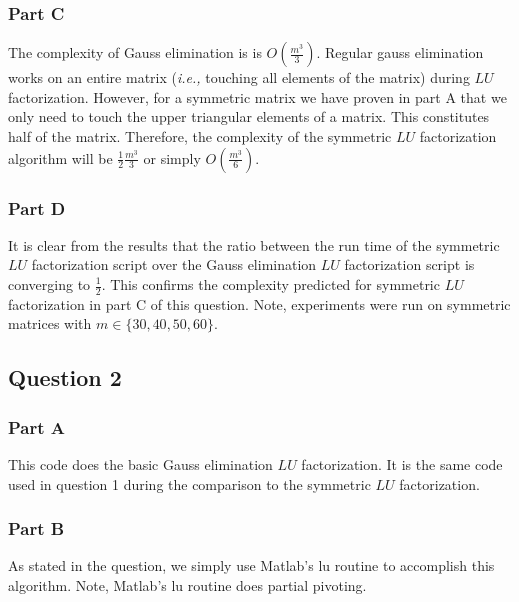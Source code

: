 

\subsubsection{Part C}
The complexity of Gauss elimination is is \(O(\frac{m^{3}}{3})\).
Regular gauss elimination works on an entire matrix ({\em i.e.,} touching all elements of the matrix) during \(LU\) factorization.
However, for a symmetric matrix we have proven in part A that we only need to touch the upper triangular elements of a matrix.
This constitutes half of the matrix.
Therefore, the complexity of the symmetric \(LU\) factorization algorithm will be \(\frac{1}{2}\frac{m^{3}}{3}\) or simply \(O(\frac{m^{3}}{6})\).

\newpage
\subsubsection{Part D}




It is clear from the results that the ratio between the run time of the symmetric \(LU\) factorization script over the Gauss elimination \(LU\) factorization script is converging to \(\frac{1}{2}\).
This confirms the complexity predicted for symmetric \(LU\) factorization in part C of this question.
Note, experiments were run on symmetric matrices with \(m \in \{30,40,50,60 \}\).

\newpage
\subsection{Question 2}

\subsubsection{Part A}
This code does the basic Gauss elimination \(LU\) factorization.
It is the same code used in question 1 during the comparison to the symmetric \(LU\) factorization.



\subsubsection{Part B}
As stated in the question, we simply use Matlab's lu routine to accomplish this algorithm.
Note, Matlab's lu routine does partial pivoting.

